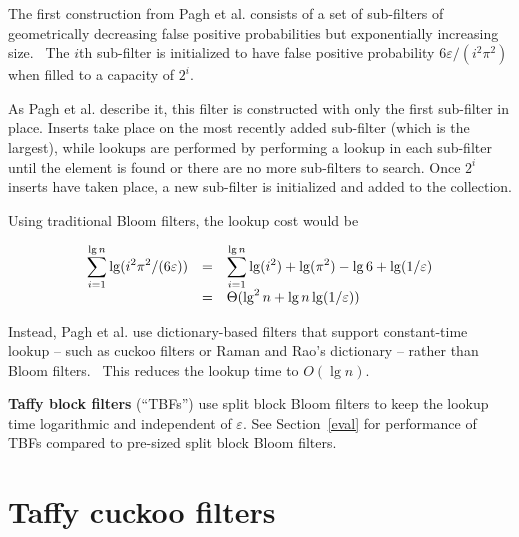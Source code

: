 \documentclass[letterpaper,twocolumn,10pt]{article}
\newcommand{\etal}{et al.}
\begin{document}
The first construction from Pagh \etal{} consists of a set of sub-filters of geometrically decreasing false positive probabilities but exponentially increasing size.~\cite{psw}
The $i$th sub-filter is initialized to have false positive probability $6 \varepsilon/(i^2 \pi^2)$ when filled to a capacity of $2^i$.

As Pagh \etal{} describe it, this filter is constructed with only the first sub-filter in place.
Inserts take place on the most recently added sub-filter (which is the largest), while lookups are performed by performing a lookup in each sub-filter until the element is found or there are no more sub-filters to search.
Once $2^i$ inserts have taken place, a new sub-filter is initialized and added to the collection.

Using traditional Bloom filters, the lookup cost would be

\[
\begin{array}{r c l}
\displaystyle\sum_{i=1}^{\lg n} \lg (i^2 \pi^2 /(6 \varepsilon)) & = &
 \displaystyle\sum_{i=1}^{\lg n} \lg (i^2) + \lg( \pi^2) - \lg 6 + \lg (1/\varepsilon) \\
& = & \Theta(\lg^2 n + \lg n \lg (1/\varepsilon))
\end{array}
\]

Instead, Pagh \etal{} use dictionary-based filters that support constant-time lookup -- such as cuckoo filters or Raman and Rao's dictionary -- rather than Bloom filters.~\cite{succinct,psw}
This reduces the lookup time to $O(\lg n)$.

{\bf Taffy block filters} (``TBFs'') use split block Bloom filters to keep the lookup time logarithmic and independent of $\varepsilon$.
See Section~\ref{eval} for performance of TBFs compared to pre-sized split block Bloom filters.


\section{Taffy cuckoo filters}
\label{tcf}
\end{document}
